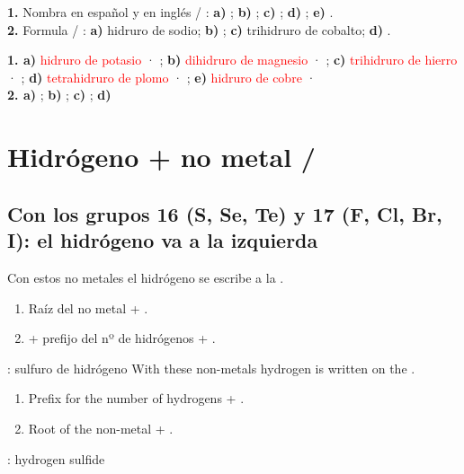 \begin{exercise}
    \textbf{1.} Nombra en español y en inglés / : \textbf{a)} ; \textbf{b)} ; \textbf{c)} ; \textbf{d)} ; \textbf{e)} .\\
    \textbf{2.} Formula / : \textbf{a)} hidruro de sodio; \textbf{b)} ; \textbf{c)} trihidruro de cobalto; \textbf{d)} .
    \begin{solu}
        \textbf{1. a)} \textcolor{red}{hidruro de potasio} · \textcolor{red}{}; \textbf{b)} \textcolor{red}{dihidruro de magnesio} · \textcolor{red}{}; \textbf{c)} \textcolor{red}{trihidruro de hierro} · \textcolor{red}{}; \textbf{d)} \textcolor{red}{tetrahidruro de plomo} · \textcolor{red}{}; \textbf{e)} \textcolor{red}{hidruro de cobre} · \textcolor{red}{}\\
        \textbf{2. a)} \textcolor{red}{}; \textbf{b)} \textcolor{red}{}; \textbf{c)} \textcolor{red}{}; \textbf{d)} \textcolor{red}{}
    \end{solu}
\end{exercise}

\section{Hidrógeno + no metal / }

\subsection{Con los grupos 16 (S, Se, Te) y 17 (F, Cl, Br, I): el hidrógeno va a la izquierda}

\begin{reglas}
    Con estos no metales el hidrógeno se escribe a la .
    \begin{enumerate}[label=\numberballgreen]
        \item Raíz del no metal + .
        \item {} + prefijo del nº de hidrógenos + .
    \end{enumerate}
    : sulfuro de hidrógeno
    \ingles
    With these non-metals hydrogen is written on the .
    \begin{enumerate}[label=\numberballgreen]
        \item Prefix for the number of hydrogens + .
        \item Root of the non-metal + .
    \end{enumerate}
    : hydrogen sulfide
\end{reglas}

